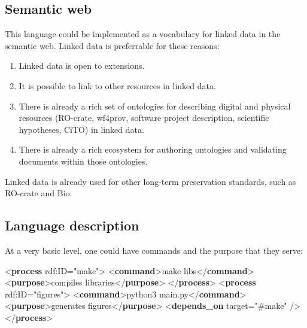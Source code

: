 \documentclass[manuscript,authordraft]{acmart}
\newenvironment{Shaded}{}{}
\newcommand{\KeywordTok}[1]{\textcolor[rgb]{0.00,0.44,0.13}{\textbf{#1}}}
\newcommand{\NormalTok}[1]{#1}
\newcommand{\OtherTok}[1]{\textcolor[rgb]{0.00,0.44,0.13}{#1}}
\newcommand{\StringTok}[1]{\textcolor[rgb]{0.25,0.44,0.63}{#1}}
\providecommand{\tightlist}{\setlength{\itemsep}{0pt}\setlength{\parskip}{0pt}}
\begin{document}
\hypertarget{semantic-web}{%
\subsection{Semantic web}\label{semantic-web}}

This language could be implemented as a vocabulary for linked data in
the semantic web. Linked data is preferrable for these reasons:

\begin{enumerate}
\def\labelenumi{\arabic{enumi}.}
\tightlist
\item
  Linked data is open to extensions.
\item
  It is possible to link to other resources in linked data.
\item
  There is already a rich set of ontologies for describing digital and
  physical resources (RO-crate, wf4prov, software project description,
  scientific hypotheses, CiTO) in linked data.
\item
  There is already a rich ecosystem for authoring ontologies and
  validating documents within those ontologies.
\end{enumerate}

Linked data is already used for other long-term preservation standards,
such as RO-crate and Bio.

\hypertarget{language-description}{%
\subsection{Language description}\label{language-description}}

At a very basic level, one could have commands and the purpose that they
serve:

\small

\begin{Shaded}
\begin{Highlighting}[]
\NormalTok{\textless{}}\KeywordTok{process}\OtherTok{ rdf:ID=}\StringTok{"make"}\NormalTok{\textgreater{}}
\NormalTok{  \textless{}}\KeywordTok{command}\NormalTok{\textgreater{}make libs\textless{}/}\KeywordTok{command}\NormalTok{\textgreater{}}
\NormalTok{  \textless{}}\KeywordTok{purpose}\NormalTok{\textgreater{}compiles libraries\textless{}/}\KeywordTok{purpose}\NormalTok{\textgreater{}}
\NormalTok{\textless{}/}\KeywordTok{process}\NormalTok{\textgreater{}}
\NormalTok{\textless{}}\KeywordTok{process}\OtherTok{ rdf:ID=}\StringTok{"figures"}\NormalTok{\textgreater{}}
\NormalTok{  \textless{}}\KeywordTok{command}\NormalTok{\textgreater{}python3 main.py\textless{}/}\KeywordTok{command}\NormalTok{\textgreater{}}
\NormalTok{  \textless{}}\KeywordTok{purpose}\NormalTok{\textgreater{}generates figures\textless{}/}\KeywordTok{purpose}\NormalTok{\textgreater{}}
\NormalTok{  \textless{}}\KeywordTok{depends\_on}\OtherTok{ target=}\StringTok{"\#make"}\NormalTok{ /\textgreater{}}
\NormalTok{\textless{}/}\KeywordTok{process}\NormalTok{\textgreater{}}
\end{Highlighting}
\end{Shaded}
\end{document}

